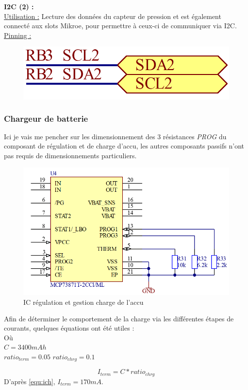 {{		\textbf{I2C (2) :} \\
		\underline{Utilisation :} Lecture des données du capteur de pression et est également connecté aux slots Mikroe, pour permettre à ceux-ci de communiquer via I2C. \\
		\underline{Pinning :} \vspace{-6mm}
		\begin{figure}[h!]
			\centering
			\includegraphics[width=0.25\linewidth]{Figures/Dev-SCH/I2C2}
			\label{fig:i2c2}
		\end{figure}

	}

	\clearpage
	\subsubsection{Chargeur de batterie} \label{sssec:BatCharger}
	{
		Ici je vais me pencher sur les dimensionnement des 3 résistances \textit{PROG} du composant de régulation et de charge d'accu, les autres composants passifs n'ont pas requis de dimensionnements particuliers.
		\begin{figure}[h]
			\centering
			\includegraphics[width=0.55\linewidth]{Figures/Dev-SCH/ChargeBat}
			\caption{IC régulation et gestion charge de l'accu}
			\label{fig:chargebat}
		\end{figure}
		
		Afin de déterminer le comportement de la charge via les différentes étapes de courants, quelques équations ont été utiles : \\
		Où \\
		$C = 3400mAh$ \\
		$ratio_{term} = 0.05$
		$ratio_{chrg} = 0.1$
		
		\begin{equation} \label{equ:ich}
			I_{term} = C * ratio_{chrg} 
		\end{equation}
		D'après \ref{equ:ich}, $I_{term} = 170mA$.
	 
}}
